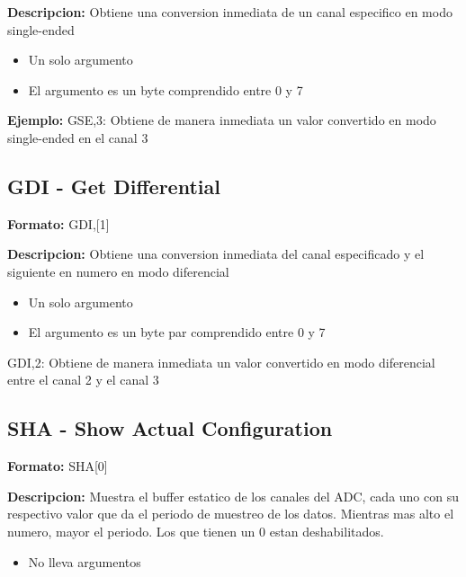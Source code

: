 \textbf{Descripcion:}
Obtiene una conversion inmediata de un canal especifico en modo single-ended

\begin{itemize}
  \item Un solo argumento
  \item El argumento es un byte comprendido entre 0 y 7
\end{itemize}

\textbf{Ejemplo:}
GSE,3: Obtiene de manera inmediata un valor convertido en modo single-ended en el canal 3


\subsection{GDI - Get Differential} %
\label{sub:gdi_get_differential}
\textbf{Formato:} GDI,[1]

\textbf{Descripcion:}
Obtiene una conversion inmediata del canal especificado y el siguiente en numero en modo diferencial

\begin{itemize}
  \item Un solo argumento
  \item El argumento es un byte par comprendido entre 0 y 7
\end{itemize}

GDI,2: Obtiene de manera inmediata un valor convertido en modo diferencial entre el canal 2 y el canal 3 

\subsection{SHA - Show Actual Configuration} %
\label{sub:sha_show_actual_configuration}
\textbf{Formato:} SHA[0]

\textbf{Descripcion:}
Muestra el buffer estatico de los canales del ADC, cada uno con su respectivo valor que da el periodo de muestreo de los datos. Mientras mas alto el numero, mayor el periodo. Los que tienen un 0 estan deshabilitados.

\begin{itemize}
  \item No lleva argumentos
\end{itemize}

